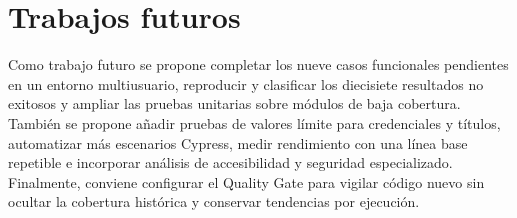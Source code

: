 \documentclass[conference]{IEEEtran}
\begin{document}
\section{Trabajos futuros}
Como trabajo futuro se propone completar los nueve casos funcionales pendientes en un entorno multiusuario, reproducir y clasificar los diecisiete resultados no exitosos y ampliar las pruebas unitarias sobre módulos de baja cobertura. También se propone añadir pruebas de valores límite para credenciales y títulos, automatizar más escenarios Cypress, medir rendimiento con una línea base repetible e incorporar análisis de accesibilidad y seguridad especializado. Finalmente, conviene configurar el Quality Gate para vigilar código nuevo sin ocultar la cobertura histórica y conservar tendencias por ejecución.
\vspace{\baselineskip}
\end{document}
